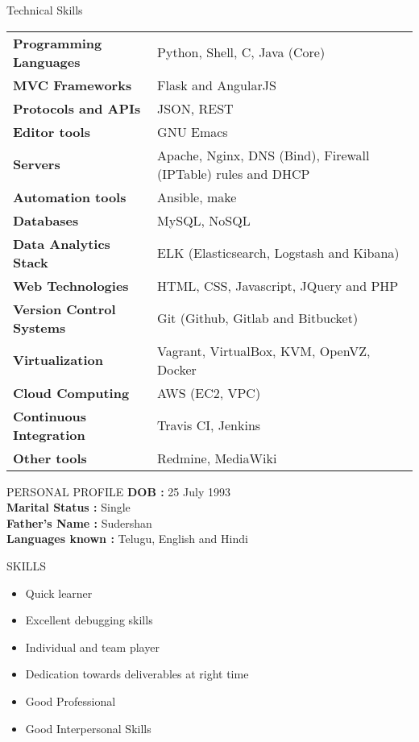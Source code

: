 \documentclass{resume} %
\begin{document}

\begin{rSection}
  {Technical Skills}

  \begin{tabular}{ @{} >{\bfseries}l @{\hspace{2ex}} l }
    Programming Languages & Python, Shell, C, Java (Core)
    \\ MVC Frameworks & Flask and AngularJS\\ Protocols and
    APIs & JSON, REST \\ Editor tools & GNU Emacs \\ Servers
    & Apache, Nginx, DNS (Bind), Firewall (IPTable) rules
    and DHCP \\ Automation tools & Ansible, make
    \\ Databases & MySQL, NoSQL \\ Data Analytics Stack &
    ELK (Elasticsearch, Logstash and Kibana) \\ Web
    Technologies & HTML, CSS, Javascript, JQuery and PHP
    \\ Version Control Systems & Git (Github, Gitlab and
    Bitbucket) \\ Virtualization & Vagrant, VirtualBox, KVM,
    OpenVZ, Docker \\ Cloud Computing & AWS (EC2, VPC)
    \\ Continuous Integration & Travis CI, Jenkins \\ Other
    tools & Redmine, MediaWiki
    
  \end{tabular}

\end{rSection}

\begin{rSection}{PERSONAL PROFILE}
  \textbf {DOB :} 25 July 1993\\
  \textbf {Marital Status :} Single \\
  \textbf {Father's Name : } Sudershan \\
  \textbf {Languages known :} Telugu, English and Hindi \\

\end{rSection}

\begin{rSection}{SKILLS}
  \begin{itemize}
  \item Quick learner
  \item Excellent debugging skills
  \item Individual and team player
  \item Dedication towards deliverables at right time
  \item Good Professional
  \item Good Interpersonal Skills

  \end{itemize}

\end{rSection}
\end{document}
